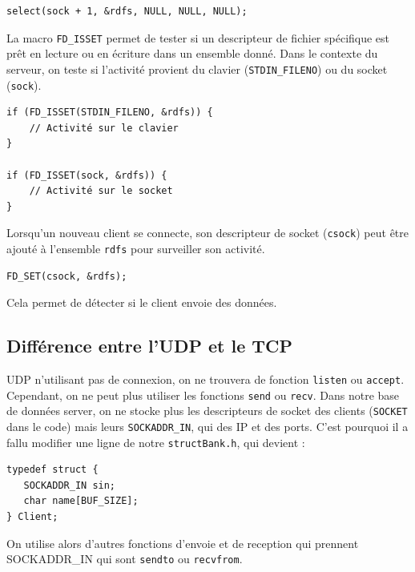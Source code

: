 \documentclass{article}
\begin{document}
\begin{verbatim}
select(sock + 1, &rdfs, NULL, NULL, NULL);
\end{verbatim}

La macro \texttt{FD_ISSET} permet de tester si un descripteur de fichier spécifique est prêt en lecture ou en écriture dans un ensemble donné. Dans le contexte du serveur, on teste si l'activité provient du clavier (\texttt{STDIN_FILENO}) ou du socket (\texttt{sock}).

\begin{verbatim}
if (FD_ISSET(STDIN_FILENO, &rdfs)) {
    // Activité sur le clavier
}

if (FD_ISSET(sock, &rdfs)) {
    // Activité sur le socket
}
\end{verbatim}

Lorsqu'un nouveau client se connecte, son descripteur de socket (\texttt{csock}) peut être ajouté à l'ensemble \texttt{rdfs} pour surveiller son activité.

\begin{verbatim}
FD_SET(csock, &rdfs);
\end{verbatim}

Cela permet de détecter si le client envoie des données.







\subsection{Différence entre l'UDP et le TCP}
UDP n'utilisant pas de connexion, on ne trouvera de fonction \texttt{listen} ou \texttt{accept}. Cependant, on ne peut plus utiliser les fonctions \texttt{send} ou \texttt{recv}. Dans notre base de données server, on ne stocke plus les descripteurs de socket des clients (\texttt{SOCKET} dans le code) mais leurs \texttt{SOCKADDR_IN}, qui des IP et des ports. C'est pourquoi il a fallu modifier une ligne de notre \texttt{structBank.h}, qui devient :

\begin{verbatim}
typedef struct {
   SOCKADDR_IN sin;
   char name[BUF_SIZE];
} Client;
\end{verbatim}

On utilise alors d'autres fonctions d'envoie et de reception qui prennent SOCKADDR\_IN qui sont \texttt{sendto} ou \texttt{recvfrom}.
\end{document}
